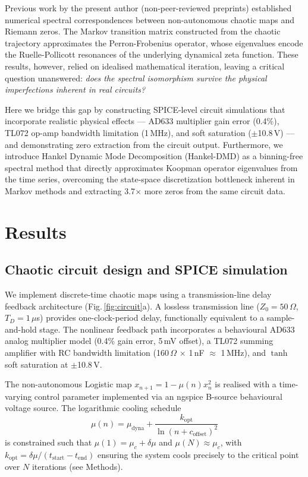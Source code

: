 \documentclass[11pt]{article}
\begin{document}
Previous work by the present author (non-peer-reviewed preprints) established numerical spectral correspondences between non-autonomous chaotic maps and Riemann zeros\cite{wang2026logistic,wang2026henon,wang2026prime}. The Markov transition matrix constructed from the chaotic trajectory approximates the Perron-Frobenius operator, whose eigenvalues encode the Ruelle-Pollicott resonances of the underlying dynamical zeta function\cite{ruelle1986,baladi2000}. These results, however, relied on idealised mathematical iteration, leaving a critical question unanswered: \emph{does the spectral isomorphism survive the physical imperfections inherent in real circuits?}

Here we bridge this gap by constructing SPICE-level circuit simulations that incorporate realistic physical effects --- AD633 multiplier gain error (0.4\%), TL072 op-amp bandwidth limitation (1\,MHz), and soft saturation ($\pm$10.8\,V) --- and demonstrating zero extraction from the circuit output. Furthermore, we introduce Hankel Dynamic Mode Decomposition (Hankel-DMD) as a binning-free spectral method that directly approximates Koopman operator eigenvalues from the time series, overcoming the state-space discretization bottleneck inherent in Markov methods and extracting 3.7$\times$ more zeros from the same circuit data.

\section*{Results}

\subsection*{Chaotic circuit design and SPICE simulation}

We implement discrete-time chaotic maps using a transmission-line delay feedback architecture (Fig.\,\ref{fig:circuit}a). A lossless transmission line ($Z_0 = 50\,\Omega$, $T_D = 1\,\mu$s) provides one-clock-period delay, functionally equivalent to a sample-and-hold stage. The nonlinear feedback path incorporates a behavioural AD633 analog multiplier model (0.4\% gain error, 5\,mV offset), a TL072 summing amplifier with RC bandwidth limitation (160\,$\Omega$ $\times$ 1\,nF $\approx$ 1\,MHz), and $\tanh$ soft saturation at $\pm$10.8\,V.

The non-autonomous Logistic map $x_{n+1} = 1 - \mu(n) x_n^2$ is realised with a time-varying control parameter implemented via an ngspice B-source behavioural voltage source. The logarithmic cooling schedule
\begin{equation}
\mu(n) = \mu_{\text{dyna}} + \frac{k_{\text{opt}}}{\ln(n + c_{\text{offset}})^2}
\label{eq:cooling}
\end{equation}
is constrained such that $\mu(1) = \mu_c + \delta\mu$ and $\mu(N) \approx \mu_c$, with $k_{\text{opt}} = \delta\mu / (t_{\text{start}} - t_{\text{end}})$ ensuring the system cools precisely to the critical point over $N$ iterations (see Methods).
\end{document}

